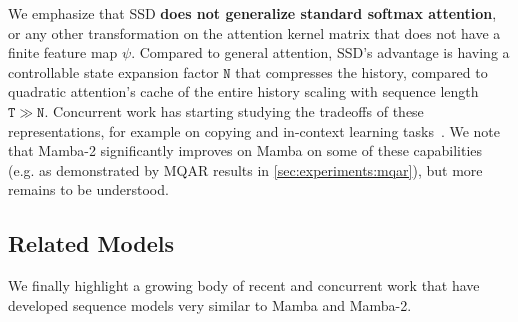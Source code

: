 We emphasize that SSD \textbf{does not generalize standard softmax attention}, or any other transformation on the attention kernel matrix that does not have a finite feature map $\psi$.
Compared to general attention, SSD's advantage is having a controllable state expansion factor $\mathtt{N}$ that compresses the history, compared to quadratic attention's cache of the entire history scaling with sequence length $\mathtt{T} \gg \mathtt{N}$.
Concurrent work has starting studying the tradeoffs of these representations, for example on copying and in-context learning tasks~\citep{akyurek2024context,jelassi2024repeat,grazzi2024mamba,park2024can}.
We note that Mamba-2 significantly improves on Mamba on some of these capabilities (e.g. as demonstrated by MQAR results in \ref{sec:experiments:mqar}), but more remains to be understood.

\subsection{Related Models}
\label{sec:related:concurrent}

We finally highlight a growing body of recent and concurrent work that have developed sequence models very similar to Mamba and Mamba-2.

